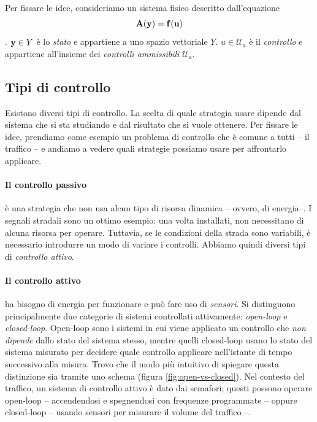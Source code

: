 Per fissare le idee, consideriamo un sistema fisico descritto dall'equazione
\begin{equation*}
    \mathbf{A}( \mathbf{y}) = \mathbf{f}( \mathbf{u})
\end{equation*}
. $\mathbf{y} \in Y$ è lo \emph{stato} e appartiene a uno spazio vettoriale
$Y$. $u \in \mathcal U_a$ è il \emph{controllo} e appartiene all'insieme dei
\emph{controlli ammissibili} $\mathcal U_a$.


\subsection{Tipi di controllo}
\label{subsec:classificazione-dei-controlli}
Esistono diversi tipi di controllo. La scelta di quale strategia
usare dipende dal sistema che si sta studiando e dal risultato che si vuole
ottenere.
Per fissare le idee, prendiamo come esempio un problema di controllo che è
comune a tutti -- il traffico -- e andiamo a vedere quali strategie possiamo
usare per affrontarlo applicare.

\paragraph{Il controllo passivo} è una strategia che non usa alcun tipo di
risorsa dinamica -- ovvero, di energia--.
I segnali stradali sono un ottimo esempio: una volta installati, non necessitano
di alcuna risorsa per operare.
Tuttavia, se le condizioni della strada sono variabili, è necessario
introdurre un modo di variare i controlli. Abbiamo quindi diversi tipi
di \emph{controllo attivo}.

\paragraph{Il controllo attivo} ha bisogno di energia per funzionare e può fare
uso di \emph{sensori}.
Si distinguono principalmente due categorie di sistemi controllati attivamente:
\emph{open-loop} e \emph{closed-loop}. Open-loop sono i sistemi in cui viene
applicato un controllo che \emph{non dipende} dallo stato del sistema stesso,
mentre quelli closed-loop usano lo stato del sistema misurato
per decidere quale controllo applicare nell'istante di tempo successivo alla misura.
Trovo che il modo più intuitivo di spiegare questa distinzione sia tramite uno
schema (figura \ref{fig:open-vs-closed}).
Nel contesto del traffico, un sistema di controllo attivo è dato dai semafori;
questi possono operare open-loop -- accendendosi e spegnendosi con
frequenze programmate -- oppure closed-loop -- usando sensori per misurare il volume del traffico --.

